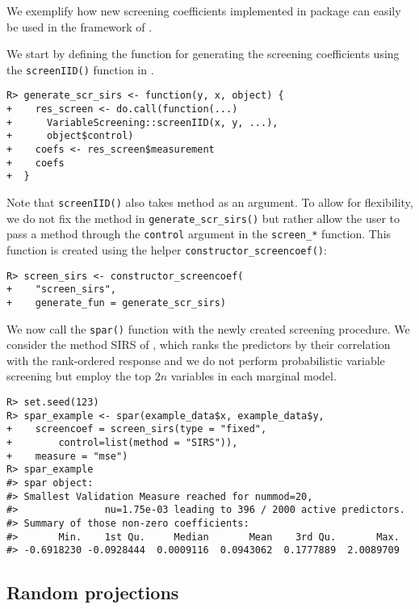 \documentclass[
  article,
  nojss]{jss}
\begin{document}
We exemplify how new screening coefficients implemented in package
 can easily be used in the framework of
.

We start by defining the function for generating the screening
coefficients using the \texttt{screenIID()} function in
.

\begin{verbatim}
R> generate_scr_sirs <- function(y, x, object) {
+    res_screen <- do.call(function(...) 
+      VariableScreening::screenIID(x, y, ...), 
+      object$control)
+    coefs <- res_screen$measurement
+    coefs
+  }
\end{verbatim}

Note that \texttt{screenIID()} also takes method as an argument. To
allow for flexibility, we do not fix the method in
\texttt{generate\_scr\_sirs()} but rather allow the user to pass a
method through the \texttt{control} argument in the \texttt{screen\_*}
function. This function is created using the helper
\texttt{constructor\_screencoef()}:

\begin{verbatim}
R> screen_sirs <- constructor_screencoef(
+    "screen_sirs", 
+    generate_fun = generate_scr_sirs)
\end{verbatim}

We now call the \texttt{spar()} function with the newly created
screening procedure. We consider the method SIRS of
\citet{zhu2011model}, which ranks the predictors by their correlation
with the rank-ordered response and we do not perform probabilistic
variable screening but employ the top \(2n\) variables in each marginal
model.

\begin{verbatim}
R> set.seed(123)      
R> spar_example <- spar(example_data$x, example_data$y,
+    screencoef = screen_sirs(type = "fixed",
+        control=list(method = "SIRS")),
+    measure = "mse")
R> spar_example
#> spar object:
#> Smallest Validation Measure reached for nummod=20,
#>               nu=1.75e-03 leading to 396 / 2000 active predictors.
#> Summary of those non-zero coefficients:
#>       Min.    1st Qu.     Median       Mean    3rd Qu.       Max. 
#> -0.6918230 -0.0928444  0.0009116  0.0943062  0.1777889  2.0089709
\end{verbatim}

\subsection{Random projections}\label{random-projections-1}
\end{document}
